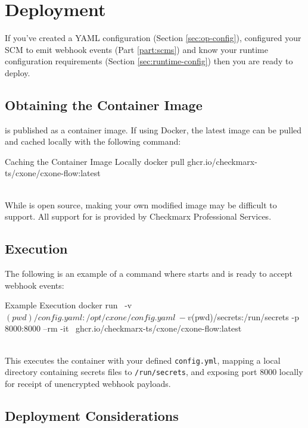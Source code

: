 \chapter{Deployment}\label{sec:deployment}

If you've created a YAML configuration (Section \ref{sec:op-config}), configured your SCM to emit webhook events
(Part \ref{part:scms}) and know your runtime configuration requirements (Section \ref{sec:runtime-config}) then
you are ready to deploy.

\section{Obtaining the Container Image}

\cxoneflow is published as a container image.  If using Docker, the latest image can be pulled and cached locally
with the following command:

\begin{code}{Caching the \cxoneflow Container Image Locally}{}{}
docker pull ghcr.io/checkmarx-ts/cxone/cxone-flow:latest
\end{code}

\noindent\\While \cxoneflow is open source, making your own modified image may be difficult to support.  All
support for \cxoneflow is provided by Checkmarx Professional Services.

\section{\cxoneflow Execution}

The following is an example of a command where \cxoneflow starts and is ready to accept webhook events:

\begin{code}{\cxoneflow Example Execution}{}{}
docker run \
    -v $(pwd)/config.yaml:/opt/cxone/config.yaml \
    -v $(pwd)/secrets:/run/secrets -p 8000:8000 --rm -it \ 
    ghcr.io/checkmarx-ts/cxone/cxone-flow:latest
\end{code}

\noindent\\This executes the container with your defined \texttt{config.yml}, mapping a local directory
containing secrets files to \texttt{/run/secrets}, and exposing port 8000 locally for receipt of 
unencrypted webhook payloads.




\section{Deployment Considerations}

